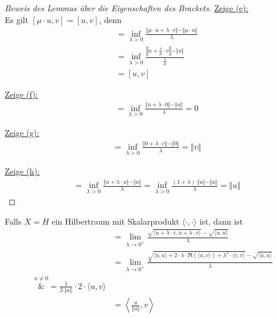 \begin{proof}[Beweis des Lemmas über die Eigenschaften des Brackets]
	\underline{Zeige (e):}\\
	Es gilt $[\mu\cdot u,v]=[u,v]$, denn
	\begin{align*}
		[\mu\cdot u,v]
		&=
		\inf\limits_{\lambda>0}\frac{\Vert\mu\cdot u+\lambda\cdot v\Vert-\Vert\mu\cdot u\Vert}{\lambda}\\
		&=\inf\limits_{\lambda>0}\frac{\left\Vert u+\frac{\lambda}{\mu}\cdot v\right\Vert-\Vert u\Vert}{\frac{\lambda}{\mu}}\\
		&=
		[u,v]
	\end{align*}

	\underline{Zeige (f):}
	\begin{align*}
		[u,0]
		&=
		\inf\limits_{\lambda>0}\frac{\Vert u+\lambda\cdot0\Vert-\Vert u\Vert}{\lambda}
		=0
	\end{align*}

	\underline{Zeige (g):}
	\begin{align*}
		[0,v]
		&=
		\inf\limits_{\lambda>0}\frac{\Vert 0+\lambda\cdot v\Vert-\Vert 0\Vert}{\lambda}
		=\Vert v\Vert
	\end{align*}

	\underline{Zeige (h):}
	\begin{align*}
		[u,u]
		&=
		\inf\limits_{\lambda>0}\frac{\Vert u+\lambda\cdot u\Vert-\Vert u\Vert}{\lambda}
		=
		\inf\limits_{\lambda>0}\frac{(1+\lambda)\cdot\Vert u\Vert-\Vert u\Vert}{\lambda}
		=\Vert u\Vert
	\end{align*}
\end{proof}

\begin{bemerkung}
	Falls $X=H$ ein Hilbertraum mit Skalarprodukt $\langle\cdot,\cdot\rangle$ ist, dann ist
	\begin{align*}
		[u,v] 
		&=
		\lim\limits_{\lambda\to0^+}\frac{\sqrt{\langle u+\lambda\cdot v,u+\lambda\cdot v\rangle}-\sqrt{\langle u,u\rangle}}{\lambda}\\
		&=\lim\limits_{\lambda\to0^+}\frac{\sqrt{\langle u,u\rangle+2\cdot\lambda\cdot\Re(\langle u,v\rangle)+\lambda^2\cdot\langle v,v\rangle}-\sqrt{\langle u,u\rangle}}{\lambda}\\
		\overset{u\neq0}&=
		\frac{1}{2\cdot\Vert u\Vert}\cdot 2\cdot\langle u,v\rangle\\
		&=\left\langle\frac{u}{\Vert u\Vert},v\right\rangle
	\end{align*}
\end{bemerkung}

